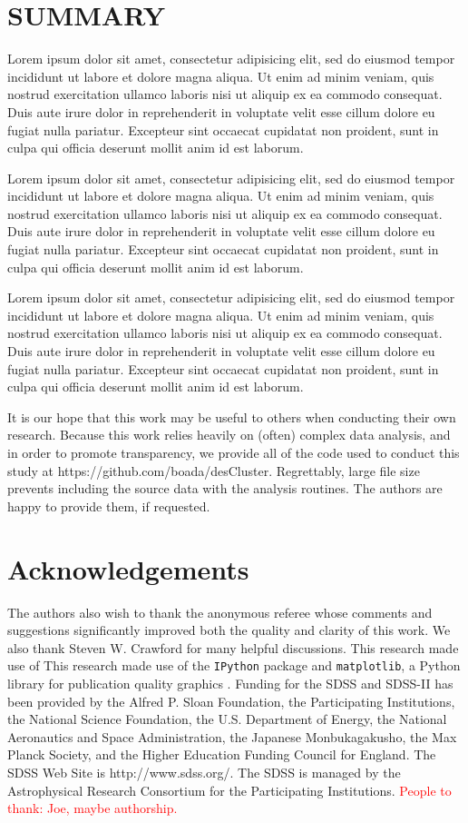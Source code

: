 \documentclass[fleqn,usenatbib]{mnras}
\newcommand{\editorial}[1]{\textcolor{red}{#1}}
\begin{document}
\section{SUMMARY}\label{sec:summary}
Lorem ipsum dolor sit amet, consectetur adipisicing elit, sed do eiusmod tempor incididunt ut labore et dolore magna aliqua. Ut enim ad minim veniam, quis nostrud exercitation ullamco laboris nisi ut aliquip ex ea commodo consequat. Duis aute irure dolor in reprehenderit in voluptate velit esse cillum dolore eu fugiat nulla pariatur. Excepteur sint occaecat cupidatat non proident, sunt in culpa qui officia deserunt mollit anim id est laborum.

Lorem ipsum dolor sit amet, consectetur adipisicing elit, sed do eiusmod tempor incididunt ut labore et dolore magna aliqua. Ut enim ad minim veniam, quis nostrud exercitation ullamco laboris nisi ut aliquip ex ea commodo consequat. Duis aute irure dolor in reprehenderit in voluptate velit esse cillum dolore eu fugiat nulla pariatur. Excepteur sint occaecat cupidatat non proident, sunt in culpa qui officia deserunt mollit anim id est laborum.

Lorem ipsum dolor sit amet, consectetur adipisicing elit, sed do eiusmod tempor incididunt ut labore et dolore magna aliqua. Ut enim ad minim veniam, quis nostrud exercitation ullamco laboris nisi ut aliquip ex ea commodo consequat. Duis aute irure dolor in reprehenderit in voluptate velit esse cillum dolore eu fugiat nulla pariatur. Excepteur sint occaecat cupidatat non proident, sunt in culpa qui officia deserunt mollit anim id est laborum.

It is our hope that this work may be useful to others when conducting their own research. Because this work relies heavily on (often) complex data analysis, and in order to promote transparency, we provide all of the code used to conduct this study at https://github.com/boada/desCluster. Regrettably, large file size prevents including the source data with the analysis routines. The authors are happy to provide them, if requested.

\section*{Acknowledgements}
The authors also wish to thank the anonymous referee whose comments and suggestions significantly improved both the quality and clarity of this work. We also thank Steven W. Crawford for many helpful discussions. This research made use of This research made use of  the {\tt IPython} package \citep{Perez2007} and {\tt matplotlib}, a Python library for publication quality graphics \citep{Hunter2007}. Funding for the SDSS and SDSS-II has been provided by the Alfred P. Sloan Foundation, the Participating Institutions, the National Science Foundation, the U.S. Department of Energy, the National Aeronautics and Space Administration, the Japanese Monbukagakusho, the Max Planck Society, and the Higher Education Funding Council for England. The SDSS Web Site is http://www.sdss.org/. The SDSS is managed by the Astrophysical Research Consortium for the Participating Institutions. \editorial{People to thank: Joe, maybe authorship.}
\end{document}
